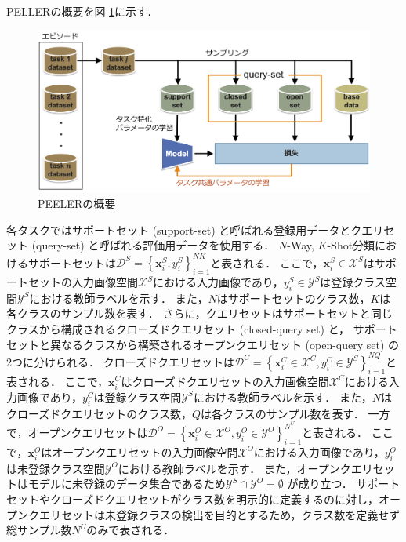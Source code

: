 PELLERの概要を図 \ref{fig:peeler}に示す．
% 
\begin{figure}[tbp]
  \centering
  \includegraphics[width=\linewidth, keepaspectratio]{image/peeler.png}
  \caption{PEELERの概要}
  \label{fig:peeler}
\end{figure}
% 
各タスクではサポートセット (support-set) と呼ばれる登録用データとクエリセット (query-set) と呼ばれる評価用データを使用する．
$N$-Way, $K$-Shot分類におけるサポートセットは$\mathcal{D}^S = \left\{ \bm{x}^S_i, y^S_i \right\}^{NK}_{i=1}$と表される．
ここで，$\bm{x}^S_i \in \mathcal{X}^S$はサポートセットの入力画像空間$\mathcal{X}^S$における入力画像であり，$y^S_i \in \mathcal{Y}^S$は登録クラス空間$\mathcal{Y}^S$における教師ラベルを示す．
また，$N$はサポートセットのクラス数，$K$は各クラスのサンプル数を表す．
さらに，クエリセットはサポートセットと同じクラスから構成されるクローズドクエリセット (closed-query set) と，
サポートセットと異なるクラスから構築されるオープンクエリセット (open-query set) の2つに分けられる．
クローズドクエリセットは$\mathcal{D}^C = \left\{ \bm{x}^C_i \in \mathcal{X}^C, y^C_i \in \mathcal{Y}^S \right\}^{NQ}_{i=1}$と表される．
ここで，$\bm{x}^C_i$はクローズドクエリセットの入力画像空間$\mathcal{X}^C$における入力画像であり，$y^C_i$は登録クラス空間$\mathcal{Y}^S$における教師ラベルを示す．
また，$N$はクローズドクエリセットのクラス数，$Q$は各クラスのサンプル数を表す．
一方で，オープンクエリセットは$\mathcal{D}^O = \left\{ \bm{x}^O_i \in \mathcal{X}^O, y^O_i \in \mathcal{Y}^O \right\}^{N^U}_{i=1}$と表される．
ここで，$\bm{x}^O_i$はオープンクエリセットの入力画像空間$\mathcal{X}^O$における入力画像であり，$y^O_i$は未登録クラス空間$\mathcal{Y}^O$における教師ラベルを示す．
また，オープンクエリセットはモデルに未登録のデータ集合であるため$\mathcal{Y}^S \cap \mathcal{Y}^O = \emptyset$ が成り立つ．
サポートセットやクローズドクエリセットがクラス数を明示的に定義するのに対し，オープンクエリセットは未登録クラスの検出を目的とするため，クラス数を定義せず総サンプル数$N^U$のみで表される．
